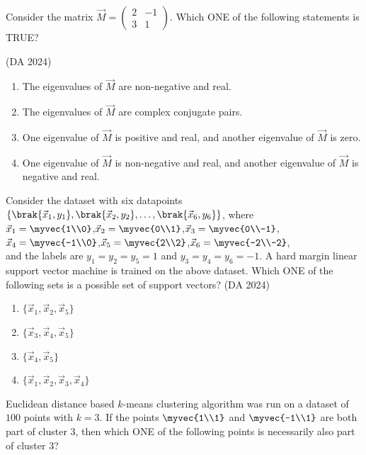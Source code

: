 \item Consider the matrix $\vec{M} = \begin{pmatrix}2 & -1\\3 & 1\end{pmatrix}$. Which ONE of the following statements is TRUE?

	\hfill (DA 2024)
\begin{enumerate}
\item The eigenvalues of $\vec{M}$ are non-negative and real.
\item The eigenvalues of $\vec{M}$ are complex conjugate pairs.
\item One eigenvalue of $\vec{M}$ is positive and real, and another eigenvalue of $\vec{M}$ is zero.
\item One eigenvalue of $\vec{M}$ is non-negative and real, and another eigenvalue of $\vec{M}$ is negative and real.
\end{enumerate} 
\item Consider the dataset with six datapoints $\{\brak{\vec{x}_1, y_1}, \brak{\vec{x}_2, y_2}, \ldots, \brak{\vec{x}_6, y_6}\}$, where\\
$\vec{x}_1 = \myvec{1\\0}$,\quad $\vec{x}_2 = \myvec{0\\1}$,\quad $\vec{x}_3 = \myvec{0\\-1}$,\quad $\vec{x}_4 = \myvec{-1\\0}$,\quad $\vec{x}_5 = \myvec{2\\2}$,\quad $\vec{x}_6 = \myvec{-2\\-2}$,\\
and the labels are $y_1 = y_2 = y_5 = 1$ and $y_3 = y_4 = y_6 = -1$. A hard margin linear support vector machine is trained on the above dataset. Which ONE of the following sets is a possible set of support vectors?
	\hfill (DA 2024)
\begin{multicols}{2}
\begin{enumerate}
\item $\{\vec{x}_1, \vec{x}_2, \vec{x}_5\}$
\item $\{\vec{x}_3, \vec{x}_4, \vec{x}_5\}$
\item $\{\vec{x}_4, \vec{x}_5\}$
\item $\{\vec{x}_1, \vec{x}_2, \vec{x}_3, \vec{x}_4\}$
\end{enumerate} 
\end{multicols}
\item Euclidean distance based $k$-means clustering algorithm was run on a dataset of $100$ points with $k=3$. If the points $\myvec{1\\1}$ and $\myvec{-1\\1}$ are both part of cluster 3, then which ONE of the following points is necessarily also part of cluster 3?
